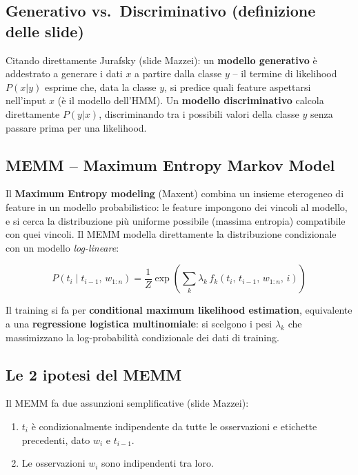 \documentclass[12pt,a4paper]{article}
\begin{document}
\subsection{Generativo vs.\ Discriminativo (definizione delle slide)}

Citando direttamente Jurafsky (slide Mazzei): un \textbf{modello generativo} è addestrato a generare i dati $x$ a partire dalla classe $y$ -- il termine di likelihood $P(x|y)$ esprime che, data la classe $y$, si predice quali feature aspettarsi nell'input $x$ (è il modello dell'HMM). Un \textbf{modello discriminativo} calcola direttamente $P(y|x)$, discriminando tra i possibili valori della classe $y$ senza passare prima per una likelihood.

\subsection{MEMM -- Maximum Entropy Markov Model}

Il \textbf{Maximum Entropy modeling} (Maxent) combina un insieme eterogeneo di feature in un modello probabilistico: le feature impongono dei vincoli al modello, e si cerca la distribuzione più uniforme possibile (massima entropia) compatibile con quei vincoli. Il MEMM modella direttamente la distribuzione condizionale con un modello \emph{log-lineare}:

\begin{formulabox}
\[
P(t_i \mid t_{i-1},\, w_{1:n}) = \frac{1}{Z}\exp\!\left(\sum_k \lambda_k\, f_k(t_i,\, t_{i-1},\, w_{1:n},\, i)\right)
\]
\end{formulabox}

Il training si fa per \textbf{conditional maximum likelihood estimation}, equivalente a una \textbf{regressione logistica multinomiale}: si scelgono i pesi $\lambda_k$ che massimizzano la log-probabilità condizionale dei dati di training.

\subsection{Le 2 ipotesi del MEMM}

Il MEMM fa due assunzioni semplificative (slide Mazzei):
\begin{enumerate}[leftmargin=1.5em, label=\arabic*.]
  \item $t_i$ è condizionalmente indipendente da tutte le osservazioni e etichette precedenti, dato $w_i$ e $t_{i-1}$.
  \item Le osservazioni $w_i$ sono indipendenti tra loro.
\end{enumerate}
\end{document}
